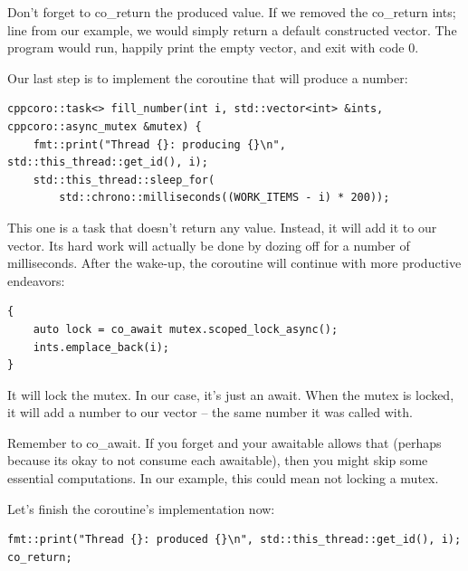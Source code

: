 \begin{tcolorbox}[colback=blue!5!white,colframe=blue!75!black, title=Note]
\hspace*{0.7cm}Don't forget to co\_return the produced value. If we removed the co\_return ints; line from our example, we would simply return a default constructed vector. The program would run, happily print the empty vector, and exit with code 0.
\end{tcolorbox}

Our last step is to implement the coroutine that will produce a number:

\begin{lstlisting}[style=styleCXX]
cppcoro::task<> fill_number(int i, std::vector<int> &ints,
cppcoro::async_mutex &mutex) {
	fmt::print("Thread {}: producing {}\n", std::this_thread::get_id(), i);
	std::this_thread::sleep_for(
		std::chrono::milliseconds((WORK_ITEMS - i) * 200));
\end{lstlisting}

This one is a task that doesn't return any value. Instead, it will add it to our vector. Its hard work will actually be done by dozing off for a number of milliseconds. After the wake-up, the coroutine will continue with more productive endeavors:

\begin{lstlisting}[style=styleCXX]
{
	auto lock = co_await mutex.scoped_lock_async();
	ints.emplace_back(i);
}
\end{lstlisting}

It will lock the mutex. In our case, it's just an await. When the mutex is locked, it will add a number to our vector – the same number it was called with.

\begin{tcolorbox}[colback=blue!5!white,colframe=blue!75!black, title=Note]
\hspace*{0.7cm}Remember to co\_await. If you forget and your awaitable allows that (perhaps because its okay to not consume each awaitable), then you might skip some essential computations. In our example, this could mean not locking a mutex.
\end{tcolorbox}

Let's finish the coroutine's implementation now:

\begin{lstlisting}[style=styleCXX]
 fmt::print("Thread {}: produced {}\n", std::this_thread::get_id(), i);
co_return;
\end{lstlisting}

